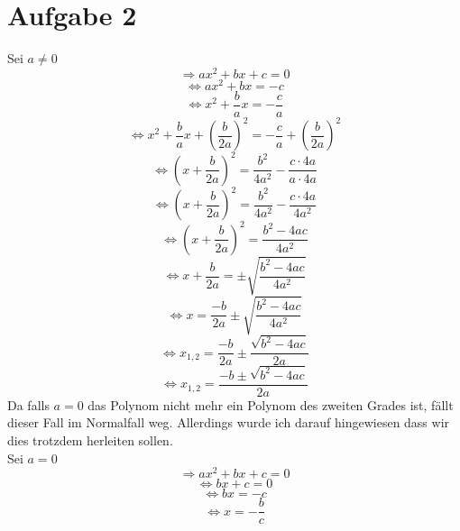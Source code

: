 \section{Aufgabe 2}
Sei $a \neq 0$
$$\Rightarrow ax^2+bx+c = 0$$
$$\Leftrightarrow ax^2+bx = -c$$
$$\Leftrightarrow x^2 + \frac{b}{a}x = - \frac{c}{a}$$
$$\Leftrightarrow x^2 + \frac{b}{a}x + (\frac{b}{2a})^2 = -\frac{c}{a} + (\frac{b}{2a})^2 $$
$$\Leftrightarrow (x+\frac{b}{2a})^2 = \frac{b^2}{4a^2} - \frac{c\cdot 4a}{a\cdot 4a}$$
$$\Leftrightarrow (x+\frac{b}{2a})^2 = \frac{b^2}{4a^2} - \frac{c\cdot 4a}{4a^2}$$
$$\Leftrightarrow (x+\frac{b}{2a})^2 = \frac{b^2-4ac}{4a^2}$$
$$\Leftrightarrow x+\frac{b}{2a} = \pm \sqrt{\frac{b^2-4ac}{4a^2}}$$
$$\Leftrightarrow x = \frac{-b}{2a} \pm \sqrt{\frac{b^2-4ac}{4a^2}}$$
$$\Leftrightarrow x_{1, 2} = \frac{-b}{2a} \pm \frac{\sqrt{b^2-4ac}}{2a}$$
$$\Leftrightarrow x_{1, 2} = \frac{-b \pm \sqrt{b^2-4ac}}{2a}$$
Da falls $a = 0$ das Polynom nicht mehr ein Polynom des zweiten Grades ist, fällt dieser Fall im Normalfall weg. Allerdings wurde ich darauf hingewiesen dass wir dies trotzdem herleiten sollen. \\
Sei $a = 0$
$$\Rightarrow ax^2+bx+c = 0$$
$$\Leftrightarrow bx+c = 0$$
$$\Leftrightarrow bx = -c$$
$$\Leftrightarrow x = -\frac{b}{c}$$